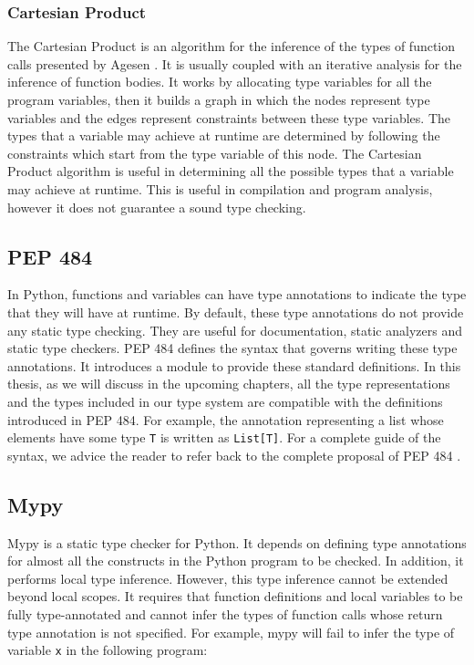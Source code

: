\subsubsection{Cartesian Product}
The Cartesian Product is an algorithm for the inference of the types of function calls presented by Agesen \cite{cpa}. It is usually coupled with an iterative analysis for the inference of function bodies. It works by allocating type variables for all the program variables, then it builds a graph in which the nodes represent type variables and the edges represent constraints between these type variables. The types that a variable may achieve at runtime are determined by following the constraints which start from the type variable of this node. The Cartesian Product algorithm is useful in determining all the possible types that a variable may achieve at runtime. This is useful in compilation and program analysis, however it does not guarantee a sound type checking.

\subsection{PEP 484 \cite{484}}
In Python, functions and variables can have type annotations to indicate the type that they will have at runtime. By default, these type annotations do not provide any static type checking. They are useful for documentation, static analyzers and static type checkers. PEP 484 defines the syntax that governs writing these type annotations. It introduces a module to provide these standard definitions. In this thesis, as we will discuss in the upcoming chapters, all the type representations and the types included in our type system are compatible with the definitions introduced in PEP 484. For example, the annotation representing a list whose elements have some type \lstinline|T| is written as \lstinline|List[T]|. For a complete guide of the syntax, we advice the reader to refer back to the complete proposal of PEP 484 \cite{484}.

\subsection{Mypy \cite{mypy}}
Mypy is a static type checker for Python. It depends on defining type annotations for almost all the constructs in the Python program to be checked. In addition, it performs local type inference. However, this type inference cannot be extended beyond local scopes. It requires that function definitions and local variables to be fully type-annotated and cannot infer the types of function calls whose return type annotation is not specified. For example, mypy will fail to infer the type of variable \lstinline|x| in the following program:

